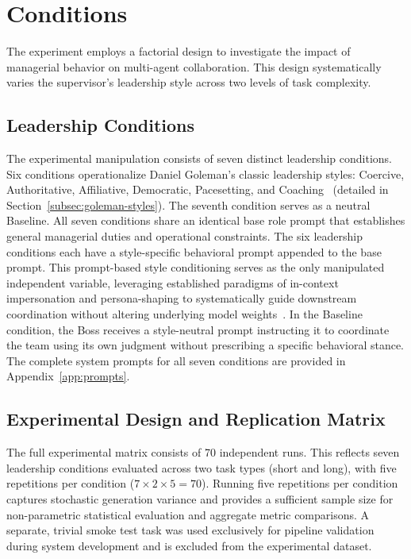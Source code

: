 \section{Conditions}
\label{sec:conditions}

The experiment employs a factorial design to investigate the impact of managerial behavior on multi-agent collaboration. 
This design systematically varies the supervisor's leadership style across two levels of task complexity.

\subsection{Leadership Conditions}
\label{subsec:leadership-conditions}

The experimental manipulation consists of seven distinct leadership conditions.
Six conditions operationalize Daniel Goleman's classic leadership styles: Coercive, Authoritative, Affiliative, Democratic, Pacesetting, and Coaching~\cite{goleman2000leadership} (detailed in Section~\ref{subsec:goleman-styles}).
The seventh condition serves as a neutral Baseline.
All seven conditions share an identical base role prompt that establishes general managerial duties and operational constraints.
The six leadership conditions each have a style-specific behavioral prompt appended to the base prompt. 
This prompt-based style conditioning serves as the only manipulated independent variable, leveraging established paradigms of in-context impersonation and persona-shaping to systematically guide downstream coordination without altering underlying model weights~\cite{lacava2025openmodelsclosedminds, salewski2023incontextimpersonationrevealslarge, shanahan2023roleplaylargelanguagemodels, serapiogarcia2025personalitytraitslargelanguage}.
In the Baseline condition, the Boss receives a style-neutral prompt instructing it to coordinate the team using its own judgment without prescribing a specific behavioral stance.
The complete system prompts for all seven conditions are provided in Appendix~\ref{app:prompts}.

\subsection{Experimental Design and Replication Matrix}
\label{subsec:replication-matrix}

The full experimental matrix consists of 70 independent runs.
This reflects seven leadership conditions evaluated across two task types (short and long), with five repetitions per condition ($7 \times 2 \times 5 = 70$).
Running five repetitions per condition captures stochastic generation variance and provides a sufficient sample size for non-parametric statistical evaluation and aggregate metric comparisons.
A separate, trivial smoke test task was used exclusively for pipeline validation during system development and is excluded from the experimental dataset.

